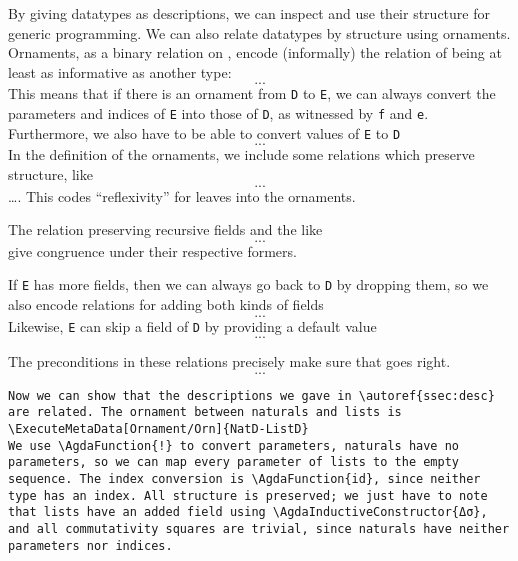 By giving datatypes as descriptions, we can inspect and use their structure for generic programming. We can also relate datatypes by structure using ornaments. Ornaments, as a binary relation on , encode (informally) the relation of being at least as informative as another type:
\[ ... \]
This means that if there is an ornament from \texttt{D} to \texttt{E}, we can always convert the parameters and indices of \texttt{E} into those of \texttt{D}, as witnessed by \texttt{f} and \texttt{e}. Furthermore, we also have to be able to convert values of \texttt{E} to \texttt{D}
\[ ... \] 
In the definition of the ornaments, we include some relations which preserve structure, like
\[ ... \]
\dots. This codes ``reflexivity'' for leaves into the ornaments.

The relation preserving recursive fields and the like
\[ ... \] 
give congruence under their respective formers.

If \texttt{E} has more fields, then we can always go back to \texttt{D} by dropping them, so we also encode relations for adding both kinds of fields
\[ ... \]
Likewise, \texttt{E} can skip a field of \texttt{D} by providing a default value
\[ ... \]

The preconditions in these relations precisely make sure that  goes right.
\[ ... \]

\begin{verbatim}
Now we can show that the descriptions we gave in \autoref{ssec:desc} are related. The ornament between naturals and lists is
\ExecuteMetaData[Ornament/Orn]{NatD-ListD}
We use \AgdaFunction{!} to convert parameters, naturals have no parameters, so we can map every parameter of lists to the empty sequence. The index conversion is \AgdaFunction{id}, since neither type has an index. All structure is preserved; we just have to note that lists have an added field using \AgdaInductiveConstructor{Δσ}, and all commutativity squares are trivial, since naturals have neither parameters nor indices.
\end{verbatim}